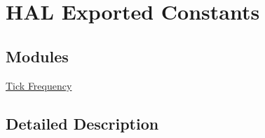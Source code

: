 \hypertarget{group___h_a_l___exported___constants}{}\section{H\+AL Exported Constants}
\label{group___h_a_l___exported___constants}
\subsection*{Modules}
\begin{DoxyCompactItemize}
\item 
\hyperlink{group___h_a_l___t_i_c_k___f_r_e_q}{Tick Frequency}
\end{DoxyCompactItemize}


\subsection{Detailed Description}
